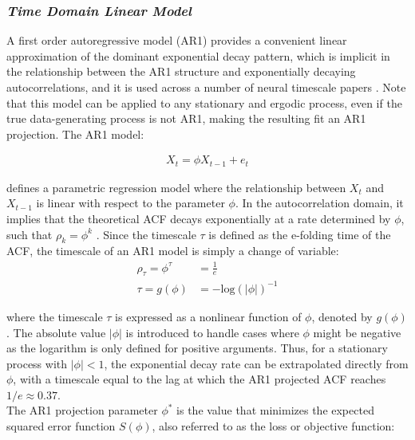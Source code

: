 \documentclass[main.tex]{subfiles}
\begin{document}
\subsubsection{\normalfont\textit{Time Domain Linear Model}}\label{sec:time-domain-linear-model}
A first order autoregressive model (AR1) provides a convenient linear approximation of the dominant exponential decay pattern, which is implicit in the relationship between the AR1 structure and exponentially decaying autocorrelations, and it is used across a number of neural timescale papers \citep{kaneoke_variance_2012, meisel_decline_2017, huang_timescales_2018, lurie_cortical_2024, shinn_functional_2023, shafiei_topographic_2020}. Note that this model can be applied to any stationary and ergodic process, even if the true data-generating process is not AR1, making the resulting fit an AR1 projection. The AR1 model:

\begin{align}\label{eq:ar1}
    X_t = \phi X_{t-1} + e_t
\end{align}

\noindent defines a parametric regression model where the relationship between $X_t$ and $X_{t-1}$ is linear with respect to the parameter $\phi$. In the autocorrelation domain, it implies that the theoretical ACF decays exponentially at a rate determined by $\phi$, such that $\rho_k = \phi^k$ \citep[chapter~14.22]{hansen_econometrics_2022}. Since the timescale $\tau$ is defined as the e-folding time of the ACF, the timescale of an AR1 model is simply a change of variable:
\begin{align}
    \rho_\tau = \phi^\tau &= \frac{1}{e}\\
    \tau = g(\phi) &= -{\text{log}(|\phi|)}^{-1} \label{eq:phi-to-tau}
\end{align}

\noindent where the timescale $\tau$ is expressed as a nonlinear function of $\phi$, denoted by $g(\phi)$. The absolute value $|\phi|$ is introduced to handle cases where $\phi$ might be negative as the logarithm is only defined for positive arguments. Thus, for a stationary process with $|\phi|<1$, the exponential decay rate can be extrapolated directly from $\phi$, with a timescale equal to the lag at which the AR1 projected ACF reaches $1/e \approx 0.37$. \\

The AR1 projection parameter $\phi^*$ is the value that minimizes the expected squared error function $S(\phi)$, also referred to as the loss or objective function:
\end{document}
